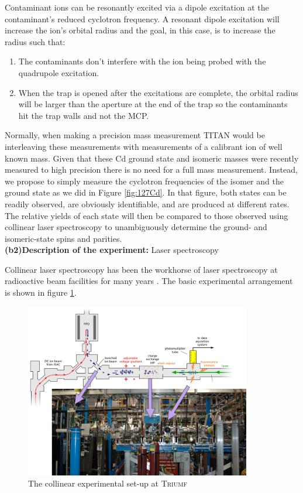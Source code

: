 \documentclass[12pt]{article}
\begin{document}
Contaminant ions can be resonantly excited via a dipole excitation at the contaminant's reduced cyclotron frequency. A resonant dipole excitation will increase the ion's orbital radius and the goal, in this case, is to increase the radius such that:
\begin{enumerate}
\item The contaminants don't interfere with the ion being probed with the quadrupole excitation.
\item When the trap is opened after the excitations are complete, the orbital radius will be larger than the aperture at the end of the trap so the contaminants hit the trap walls and not the MCP.
\end{enumerate}

Normally, when making a precision mass measurement TITAN would be interleaving these measurements with measurements of a calibrant ion of well known mass. Given that these Cd ground state and isomeric masses were recently measured to high precision \cite{Lascar2017,Hakala2012,Kankainen2013,Atanasov2015} there is no need for a full mass measurement. Instead, we propose to simply measure the cyclotron frequencies of the isomer and the ground state as we did in Figure \ref{fig:127Cd}. In that figure, both states can be readily observed, are obviously identifiable, and are produced at different rates. The relative yields of each state will then be compared to those observed using collinear laser spectroscopy to unambiguously determine the ground- and isomeric-state spins and parities.\\

\noindent\textbf{(b2)Description of the experiment:} Laser spectroscopy

Collinear laser spectroscopy has been the workhorse of laser spectroscopy at radioactive beam facilities for many years \cite{Campbell2016}. The basic experimental arrangement is shown in figure \ref{colfig}.
\begin{figure}
\begin{center}
\includegraphics[height=3in]{beam-RFQ.pdf}
\caption{The collinear experimental set-up at \textsc{Triumf}}\label{colfig}
\end{center}
\end{figure}
\end{document}
